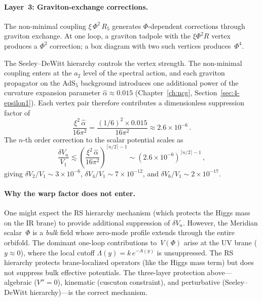 \paragraph{Layer~3: Graviton-exchange corrections.}
The non-minimal coupling $\xi\,\Phi^2\,R_5$ generates $\Phi$-dependent corrections through graviton exchange. At one loop, a graviton tadpole with the $\xi\Phi^2 R$ vertex produces a $\Phi^2$ correction; a box diagram with two such vertices produces~$\Phi^4$.

The Seeley--DeWitt hierarchy controls the vertex strength. The non-minimal coupling enters at the $a_2$ level of the spectral action, and each graviton propagator on the AdS$_5$ background introduces one additional power of the curvature expansion parameter $\hat{\alpha} \approx 0.015$ (Chapter~\ref{ch:ncg}, Section~\ref{sec:4-epsilon1}). Each vertex pair therefore contributes a dimensionless suppression factor of
\begin{equation}
  \label{eq:app-grav-factor}
  \frac{\xi^2\, \hat{\alpha}}{16\pi^2}
  = \frac{(1/6)^2 \times 0.015}{16\pi^2}
  \approx 2.6 \times 10^{-6}\,.
\end{equation}
The $n$-th order correction to the scalar potential scales as
\begin{equation}
  \label{eq:app-Vn-scaling}
  \frac{\delta V_n}{V_1}
  \lesssim \left(\frac{\xi^2\,\hat{\alpha}}{16\pi^2}\right)^{\!\lceil n/2 \rceil - 1}
  \sim (2.6 \times 10^{-6})^{\lceil n/2 \rceil - 1}\,,
\end{equation}
giving $\delta V_2/V_1 \sim 3 \times 10^{-6}$, $\delta V_4/V_1 \sim 7 \times 10^{-12}$, and $\delta V_6/V_1 \sim 2 \times 10^{-17}$.

\paragraph{Why the warp factor does not enter.}
One might expect the RS hierarchy mechanism (which protects the Higgs mass on the IR brane) to provide additional suppression of $\delta V_n$. However, the Meridian scalar~$\Phi$ is a \emph{bulk} field whose zero-mode profile extends through the entire orbifold. The dominant one-loop contributions to~$V(\Phi)$ arise at the UV brane ($y \approx 0$), where the local cutoff $\Lambda(y) = k\,e^{-A(y)}$ is unsuppressed. The RS hierarchy protects brane-localized operators (like the Higgs mass term) but does not suppress bulk effective potentials. The three-layer protection above---algebraic ($V'' = 0$), kinematic (cuscuton constraint), and perturbative (Seeley--DeWitt hierarchy)---is the correct mechanism.

